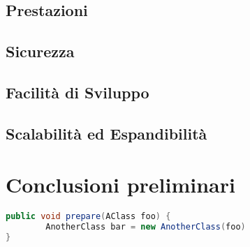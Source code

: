 \subsection{Prestazioni}
\subsection{Sicurezza}
\subsection{Facilità di Sviluppo}
\subsection{Scalabilità ed Espandibilità}

\newpage
\section{Conclusioni preliminari}
\label{sec:ConclusioniTecnologie}

\newpage


\begin{lstlisting}[language=Java, label=lst:java, caption={Some code in another language than the default one}]
public void prepare(AClass foo) {
        AnotherClass bar = new AnotherClass(foo)
}
\end{lstlisting}
